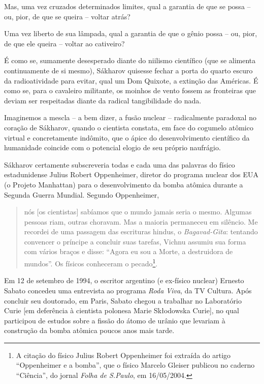 Mas, uma vez cruzados determinados limites, qual a garantia de que se
possa -- ou, pior, de que se queira -- voltar atrás?

Uma vez liberto de sua lâmpada, qual a garantia de que o gênio possa --
ou, pior, de que ele queira -- voltar ao cativeiro?

É como se, sumamente desesperado diante do niilismo científico (que se
alimenta continuamente de si mesmo), Sákharov quisesse fechar a porta do
quarto escuro da radioatividade para evitar, qual um Dom Quixote, a
extinção das Américas. É como se, para o cavaleiro militante, os moinhos
de vento fossem as fronteiras que deviam ser respeitadas diante da
radical tangibilidade do nada.

Imaginemos a mescla -- a bem dizer, a fusão nuclear -- radicalmente
paradoxal no coração de Sákharov, quando o cientista constata, em face
do cogumelo atômico virtual e concretamente indômito, que o ápice do
desenvolvimento científico da humanidade coincide com o potencial elogio
de seu próprio naufrágio.

Sákharov certamente subscreveria todas e cada uma das palavras do físico
estadunidense Julius Robert Oppenheimer, diretor do programa nuclear dos
EUA (o Projeto Manhattan) para o desenvolvimento da bomba atômica
durante a Segunda Guerra Mundial. Segundo Oppenheimer,

\begin{quote}
nós {[}os cientistas{]} sabíamos que o mundo jamais seria o mesmo.
Algumas pessoas riam, outras choravam. Mas a maioria permaneceu em
silêncio. Me recordei de uma passagem das escrituras hindus, o
\emph{Bagavad-Gita}: tentando convencer o príncipe a concluir suas
tarefas, Vichnu assumiu sua forma com vários braços e disse: ``Agora eu
sou a Morte, a destruidora de mundos''. Os físicos conheceram o
pecado\footnote{A citação do físico Julius Robert Oppenheimer foi
  extraída do artigo ``Oppenheimer e a bomba'', que o físico Marcelo
  Gleiser publicou no caderno ``Ciência'', do jornal \emph{Folha de
  S.Paulo}, em 16/05/2004.}.
\end{quote}

Em 12 de setembro de 1994, o escritor argentino (e ex-físico nuclear)
Ernesto Sabato concedeu uma entrevista ao programa \emph{Roda Viva}, da
TV Cultura. Após concluir seu doutorado, em Paris, Sabato chegou a
trabalhar no Laboratório Curie {[}em deferência à cientista polonesa
Marie Skłodowska Curie{]}, no qual participou de estudos sobre a fissão
do átomo de urânio que levariam à construção da bomba atômica poucos
anos mais tarde.

